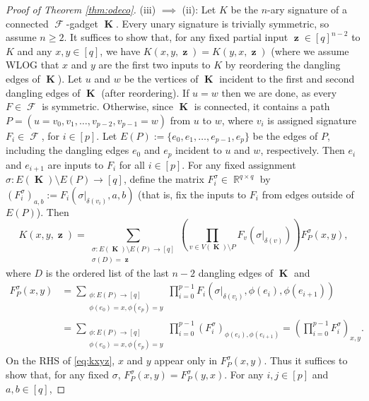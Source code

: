 \documentclass{article}
\DeclareMathOperator{\rr}{\mathbb{R}}
\DeclareMathOperator{\vk}{\mathbf{K}}
\DeclareMathOperator{\vz}{\mathbf{z}}
\DeclareMathOperator{\fc}{\mathcal{F}}
\begin{document}
\begin{proof}[Proof of Theorem \ref{thm:odeco}]
    (iii) $\implies$ (ii): Let $K$ be the $n$-ary signature of a connected $\fc$-gadget $\vk$.
    Every unary signature is trivially symmetric, so assume $n \geq 2$. It suffices to show that,
    for any fixed partial input $\vz \in [q]^{n-2}$ to $K$ and any $x,y \in [q]$, we have
    $K(x,y,\vz) = K(y,x,\vz)$ (where we assume WLOG that $x$ and $y$ are the first two inputs to $K$
    by reordering the dangling edges of $\vk$). Let $u$ and $w$ be the vertices of $\vk$ incident to
    the first and second dangling edges of $\vk$ (after reordering).
    If $u = w$ then we are done, as every $F \in \fc$ is symmetric.
    Otherwise, since $\vk$ is connected, it contains a path 
    $P = (u = v_0,v_1,\ldots,v_{p-2},v_{p-1} = w)$ 
    from $u$ to $w$, where $v_i$ is assigned signature $F_i \in \fc$, for $i \in [p]$.
    Let $E(P) := \{e_0,e_1,\ldots,e_{p-1},e_p\}$ be the edges of $P$, including the dangling edges
    $e_0$ and $e_p$ incident to $u$ and $w$, respectively.
    Then $e_i$ and $e_{i+1}$ are inputs to $F_i$ for all $i \in [p]$. 
    For any fixed assignment $\sigma: E(\vk) \setminus E(P) \to [q]$,
    define the matrix $F^\sigma_i \in \rr^{q \times q}$ by 
    $(F^\sigma_i)_{a,b} := F_i(\sigma|_{\delta(v_i)},a,b)$ 
    (that is, fix the inputs to $F_i$ from edges outside of $E(P)$). Then
    \begin{equation}
        K(x,y,\vz) = 
        \sum_{\substack{\sigma: E(\vk) \setminus E(P) \to [q] \\ \sigma(D) = \vz}} 
        \left(\prod_{v \in V(\vk) \setminus P} F_v(\sigma|_{\delta(v)})\right) 
        F^\sigma_P(x,y),
        \label{eq:kxyz}
    \end{equation}
    where $D$ is the ordered list of the last $n-2$ dangling edges of $\vk$ and
    \begin{align*}
        F^\sigma_P(x,y) 
        &= \sum_{\substack{\phi: E(P) \to [q] \\ \phi(e_0)=x,\phi(e_p)=y}} 
            \prod_{i=0}^{p-1} F_i(\sigma|_{\delta(v_i)}, \phi(e_i),\phi(e_{i+1})) \\
        &= \sum_{\substack{\phi: E(P) \to [q] \\ \phi(e_0)=x,\phi(e_p)=y}} 
        \prod_{i=0}^{p-1} (F^\sigma_i)_{\phi(e_i),\phi(e_{i+1})}
        = \left(\prod_{i=0}^{p-1} F^\sigma_i\right)_{x,y}.
    \end{align*}
    On the RHS of \eqref{eq:kxyz}, $x$ and $y$
    appear only in $F_P^\sigma(x,y)$. Thus it suffices to show that, for any fixed $\sigma$,
    $F^\sigma_P(x,y) = F^\sigma_P(y,x)$. For any $i,j \in [p]$ and $a,b \in [q]$,

\end{proof}
\end{document}
